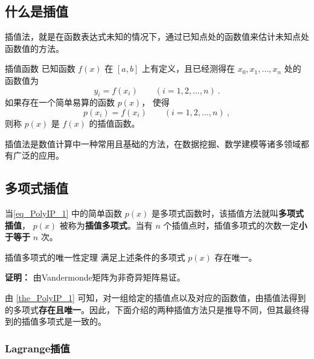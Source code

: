 
\begin{issues}
\issueTODO
{}
\end{issues}
\subsection{什么是插值}
插值法，就是在函数表达式未知的情况下，通过已知点处的函数值来估计未知点处函数值的方法。\begin{definition}{插值函数}
已知函数 $f(x)$ 在 $\left[a,b\right] $ 上有定义，且已经测得在 $x_0,x_1,\dots, x_n$ 处的函数值为
\begin{equation}
y_i = f(x_i) \qquad (i = 1,2, \dots, n)~.
\end{equation}
如果存在一个简单易算的函数 $p(x)$， 使得
\begin{equation}
\label{eq_PolyIP_1}
p(x_i) = f(x_i)\qquad (i = 1,2, \dots, n)~,
\end{equation}
则称 $p(x)$ 是 $f(x)$ 的插值函数。
\end{definition}

插值法是数值计算中一种常用且基础的方法，在数据挖掘、数学建模等诸多领域都有广泛的应用。

\subsection{多项式插值}
当\autoref{eq_PolyIP_1} 中的简单函数 $p(x)$ 是多项式函数时，该插值方法就叫\textbf{多项式插值}， $p(x)$ 被称为\textbf{插值多项式}。当有 $n$ 个插值点时，插值多项式的次数一定\textbf{小于等于} $n$ 次。
\begin{theorem}{插值多项式的唯一性定理}\label{the_PolyIP_1}
满足上述条件的多项式 $p(x)$ 存在唯一。

\end{theorem}
\textbf{证明：} 由Vandermonde矩阵为非奇异矩阵易证。

由 \autoref{the_PolyIP_1} 可知，对一组给定的插值点以及对应的函数值，由插值法得到的多项式\textbf{存在且唯一}。因此，下面介绍的两种插值方法只是推导不同，但其最终得到的插值多项式是一致的。
\subsubsection{Lagrange插值}

